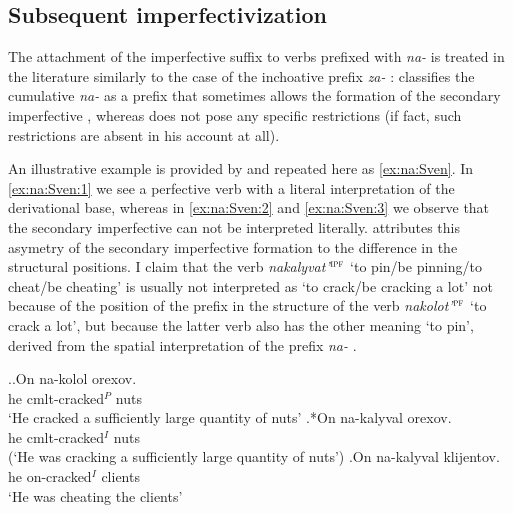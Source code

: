 \subsection{Subsequent imperfectivization }
The attachment of the imperfective suffix   to verbs prefixed with \textit{na-}   is treated in the literature similarly to the case of the inchoative  prefix \textit{za-}  : \citet[230]{Svenonius:04b} classifies the cumulative  \textit{na-}   as a prefix that sometimes allows the formation of the secondary imperfective , whereas \citet{Tatevosov:09} does not pose any specific restrictions (if fact, such restrictions are absent in his account at all).

An illustrative example is provided by \citet[233]{Svenonius:04b} and repeated here as \ref{ex:na:Sven}. In \ref{ex:na:Sven:1} we see a perfective verb  with a literal interpretation of the derivational base, whereas in \ref{ex:na:Sven:2} and \ref{ex:na:Sven:3} we observe that the secondary imperfective  can not be interpreted literally. \citet[233]{Svenonius:04b} attributes this asymetry of the secondary imperfective  formation to the difference in the structural positions. I claim that the verb \textit{nakalyvat'}$^{\textsc{ipf}}$ `to pin/be pinning/to cheat/be cheating' is usually not interpreted as `to crack/be cracking a lot' not because of the position of the prefix in the structure of the verb \textit{nakolot'}$^{\textsc{pf}}$ `to crack a lot', but because the latter verb also has the other meaning `to pin', derived from the spatial  interpretation of the prefix \textit{na-}  . 

\ex.\label{ex:na:Sven}\ag.\label{ex:na:Sven:1}On na-kolol orexov.\\
he cmlt-cracked$^P$ nuts\\
\trans `He cracked a sufficiently large quantity of nuts'
\bg.\label{ex:na:Sven:2}*On na-kalyval orexov.\\
he cmlt-cracked$^I$ nuts\\
\vspace{0.5em}
(`He was cracking a sufficiently large quantity of nuts')
\bg.\label{ex:na:Sven:3}On na-kalyval klijentov.\\
he on-cracked$^I$ clients\\
\trans `He was cheating the clients'\\

